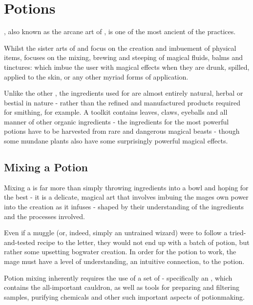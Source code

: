 \chapter{Potions}\label{S:Alchemy}

, also known as the arcane art of , is one of the most ancient of the  practices.

Whilst the sister arts of  and  focus on the creation and imbuement of physical items,  focuses on the mixing, brewing and steeping of magical fluids, balms and tinctures:  which imbue the user with magical effects when they are drunk, spilled, applied to the skin, or any other myriad forms of application. 

Unlike the other , the ingredients used for  are almost entirely natural, herbal or bestial in nature - rather than the refined and manufactured products required for smithing, for example. A  toolkit contains leaves, claws, eyeballs and all manner of other organic ingredients - the ingredients for the most powerful potions have to be harvested from rare and dangerous magical beasts - though some mundane plants also have some surprisingly powerful magical effects. 

\section{Mixing a Potion}

Mixing a  is far more than simply throwing ingredients into a bowl and hoping for the best - it is a delicate, magical art that involves imbuing the mages own power into the creation as it infuses - shaped by their understanding of the ingredients and the processes involved. 

Even if a muggle (or, indeed, simply an untrained wizard) were to follow a tried-and-tested recipe to the letter, they would not end up with a batch of  potion, but rather some upsetting bogwater creation. In order for the potion to work, the mage must have a level of understanding, an intuitive connection, to the potion. 

Potion mixing inherently requires the use of a set of  - specifically an , which contains the all-important cauldron, as well as tools for preparing and filtering samples, purifying chemicals 
and other such important aspects of potionmaking.

